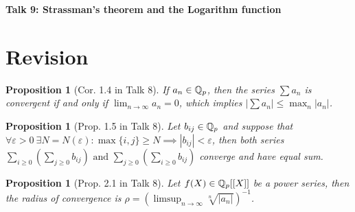 \documentclass{article}
\theoremstyle{plain}
\newtheorem{prop}[thm]{Proposition}
\theoremstyle{definition}
\begin{document}
\pagestyle{fancy}
\renewcommand{\footrulewidth}{0.4pt}
\fancyhead{}
\fancyfoot{}
\begin{center}
	\Huge{\textbf{Talk 9: Strassman's theorem and the Logarithm function}}%
\end{center}
\begin{minipage}[t]{0.49\textwidth}%
		\section{Revision}
			\begin{prop}[Cor. 1.4 in Talk 8]
			If $a_{n} \in \Bbb Q_{p}$, then the series $\sum a_{n}$ is convergent if and only if $\lim_{n \to \infty}a_{n} = 0$, which implies $\left | \sum a_{n} \right| \leq \max_{n}|a_{n}|$.
			\end{prop}
			\begin{prop}[Prop. 1.5 in Talk 8]
			Let $b_{ij} \in \Bbb Q_{p}$ and suppose that $\forall \varepsilon > 0\ \exists N = N(\varepsilon) : \max\{i,j\} \geq N \implies |b_{ij}| < \varepsilon$, then both series
			$\sum_{i \geq 0}\left(\sum_{j \geq 0} b_{ij} \right) \text{ and } \sum_{j \geq 0}\left(\sum_{i\geq 0} b_{ij} \right)$
			converge and have equal sum.
			\end{prop}
			\begin{prop}[Prop. 2.1 in Talk 8]
			Let $f(X) \in \Bbb Q_{p}[[X]]$ be a power series, then the radius of convergence is
			$\rho = \left(\limsup_{n \to \infty}\sqrt[n]{|a_{n}|}\right)^{-1}$.
		      \end{prop}

\end{minipage}
\end{document}
